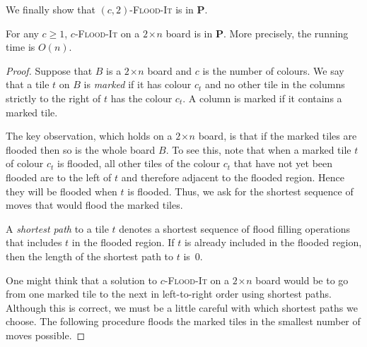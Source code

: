 \documentclass[a4paper,11pt]{llncs}
\newcounter{l}
\renewcommand{\geq}{\geqslant}
\newcommand{\Ptime}{\ensuremath{\mathbf{P}}}
\newcommand{\Coloroid}[1]{$#1$-\textsc{Flood-It}}
\newcommand{\recdim}[2]{$#1$$\mspace{1mu}$$\times$$\mspace{1mu}$$#2$}
\begin{document}
We finally show that \Coloroid{(c,2)} is in \Ptime.

\begin{theorem}
    \label{thm:height2}
    For any $c\geq 1$, \Coloroid{c} on a \recdim{2}{n} board is in \Ptime. More precisely, the running time is $O(n)$.
\end{theorem}
\begin{proof}
    Suppose that $B$ is a \recdim{2}{n} board and $c$ is the number of colours. We say that a tile $t$ on $B$ is \emph{marked} if it has colour $c_t$ and no other tile in the columns strictly to the right of $t$ has the colour $c_t$. A column is marked if it contains a marked tile.

    The key observation, which holds on a \recdim{2}{n} board, is that if the marked tiles are flooded then so is the whole board $B$. To see this, note that when a marked tile $t$ of colour $c_t$ is flooded, all other tiles of the colour $c_t$ that have not yet been flooded are to the left of $t$ and therefore adjacent to the flooded region. Hence they will be flooded when $t$ is flooded. Thus, we ask for the shortest sequence of moves that would flood the marked tiles.

    A \emph{shortest path} to a tile $t$ denotes a shortest sequence of flood filling operations that includes  $t$ in the flooded region. If $t$ is already included in the flooded region, then the length of the shortest path to $t$ is~0.

    One might think that a solution to \Coloroid{c} on a \recdim{2}{n} board would be to go from one marked tile to the next in left-to-right order using shortest paths. Although this is correct, we must be a little careful with which shortest paths we choose. The following procedure floods the marked tiles in the smallest number of moves possible.


\end{proof}
\end{document}

